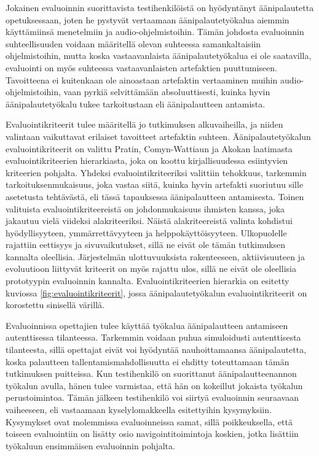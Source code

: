 \documentclass[utf8]{gradu3}
\begin{document}
Jokainen evaluoinnin suorittavista testihenkilöistä on hyödyntänyt äänipalautetta opetuksessaan, joten he pystyvät vertaamaan äänipalautetyökalua aiemmin käyttämiinsä menetelmiin ja audio-ohjelmistoihin. Tämän johdosta evaluoinnin suhteellisuuden voidaan määritellä olevan suhteessa samankaltaisiin ohjelmistoihin, mutta koska vastaavanlaista äänipalautetyökalua ei ole saatavilla, evaluointi on myös suhteessa vastaavanlaisten artefaktien puuttumiseen. Tavoitteena ei kuitenkaan ole ainoastaan artefaktin vertaaminen muihin audio-ohjelmistoihin, vaan pyrkiä selvittämään absoluuttisesti, kuinka hyvin äänipalautetyökalu tukee tarkoitustaan eli äänipalautteen antamista.

Evaluointikriteerit tulee määritellä jo tutkimuksen alkuvaiheilla, ja niiden valintaan vaikuttavat erilaiset tavoitteet artefaktin suhteen. Äänipalautetyökalun evaluointikriteerit on valittu Pratin, Comyn-Wattiaun ja Akokan \parencite*{cycles} laatimasta evaluointikriteerien hierarkiasta, joka on koottu kirjallisuudessa esiintyvien kriteerien pohjalta. Yhdeksi evaluointikriteeriksi valittiin tehokkuus, tarkemmin tarkoituksenmukaisuus, joka vastaa siitä, kuinka hyvin artefakti suoriutuu sille asetetusta tehtävästä, eli tässä tapauksessa äänipalautteen antamisesta. Toinen valituista evaluointikriteereistä on johdonmukaisuus ihmisten kanssa, joka jakautuu vielä viideksi alakriteeriksi. Näistä alakriteereistä valinta kohdistui hyödyllisyyteen, ymmärrettävyyteen ja helppokäyttöisyyteen. Ulkopuolelle rajattiin eettisyys ja sivuvaikutukset, sillä ne eivät ole tämän tutkimuksen kannalta oleellisia. Järjestelmän ulottuvuuksista rakenteeseen, aktiivisuuteen ja evoluutioon liittyvät kriteerit on myös rajattu ulos, sillä ne eivät ole oleellisia prototyypin evaluoinnin kannalta. Evaluointikriteerien hierarkia on esitetty kuviossa \ref{fig:evaluointikriteerit}, jossa äänipalautetyökalun evaluointikriteerit on korostettu sinisellä värillä.
 
Evaluoinnissa opettajien tulee käyttää työkalua äänipalautteen antamiseen autenttisessa tilanteessa. Tarkemmin voidaan puhua simuloidusti autenttisesta tilanteesta, sillä opettajat eivät voi hyödyntää nauhoittamaansa äänipalautetta, koska palautteen tallentamismahdollisuutta ei ehditty toteuttamaan tämän tutkimuksen puitteissa. Kun testihenkilö on suorittanut äänipalautteenannon työkalun avulla, hänen tulee varmistaa, että hän on kokeillut jokaista työkalun perustoimintoa. Tämän jälkeen testihenkilö voi siirtyä evaluoinnin seuraavaan vaiheeseen, eli vastaamaan kyselylomakkeella esitettyihin kysymyksiin. Kysymykset ovat molemmissa evaluoinneissa samat, sillä poikkeuksella, että toiseen evaluointiin on lisätty osio navigointitoimintoja koskien, jotka lisättiin työkaluun ensimmäisen evaluoinnin pohjalta.
\end{document}
